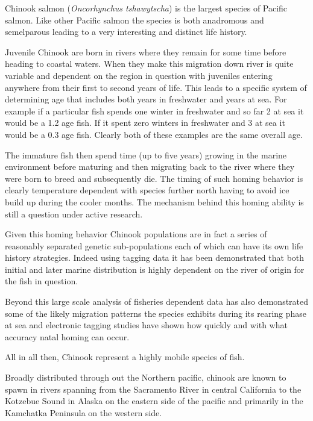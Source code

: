 \documentclass[11pt]{article}
\begin{document}
Chinook salmon (\textit{Oncorhynchus tshawytscha}) is the largest species of Pacific salmon. Like other Pacific salmon the species is both anadromous and semelparous leading to a very interesting and distinct life history. 

Juvenile Chinook are born in rivers where they remain for some time before heading to coastal waters. When they make this migration down river is quite variable and dependent on the region in question with juveniles entering anywhere from their first to second years of life. This leads to a specific system of determining age that includes both years in freshwater and years at sea. For example if a particular fish spends one winter in freshwater and so far 2 at sea it would be a 1.2 age fish. If it spent zero winters in freshwater and 3 at sea it would be a 0.3 age fish. Clearly both of these examples are the same overall age.

The immature fish then spend time (up to five years) growing in the marine environment before maturing and then migrating back to the river where they were born to breed and subsequently die. The timing of such homing behavior is clearly temperature dependent with species further north having to avoid ice build up during the cooler months. The mechanism behind this homing ability is still a question under active research. \newline

Given this homing behavior Chinook populations are in fact a series of reasonably separated genetic sub-populations each of which can have its own life history strategies. Indeed using tagging data it has been demonstrated that both initial and later marine distribution is highly dependent on the river of origin for the fish in question. 

Beyond this large scale analysis of fisheries dependent data has also demonstrated some of the likely migration patterns the species exhibits during its rearing phase at sea and electronic tagging studies have shown how quickly and with what accuracy natal homing can occur. 

All in all then, Chinook represent a highly mobile species of fish.\newline

Broadly distributed through out the Northern pacific, chinook are known to spawn in rivers spanning from the Sacramento River in central California to the Kotzebue Sound in Alaska on the eastern side of the pacific and primarily in the Kamchatka Peninsula on the western side. 
\end{document}
